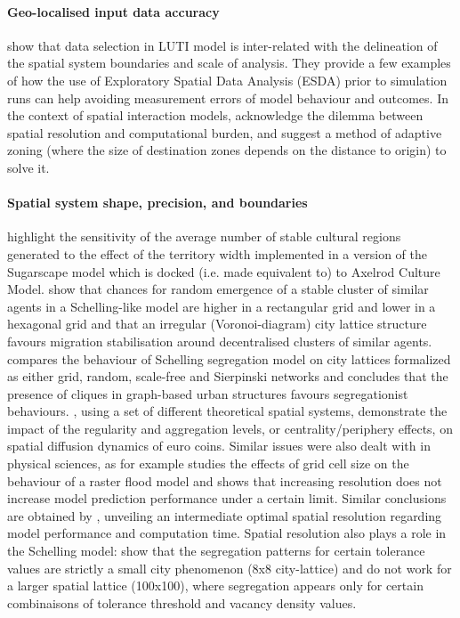 \documentclass[3p,times,procedia]{elsarticle}
\begin{document}
\paragraph{Geo-localised input data accuracy} \citet{Thomasetal2017} show that data selection in LUTI model is inter-related with the delineation of the spatial system boundaries and scale of analysis. They provide a few examples of how the use of Exploratory Spatial Data Analysis (ESDA) prior to simulation runs can help avoiding measurement errors of model behaviour and outcomes. In the context of spatial interaction models, \citet{hagen2012new} acknowledge the dilemma between spatial resolution and  computational burden, and suggest a method of adaptive zoning (where the size of destination zones depends on the distance to origin) to solve it.

\paragraph{Spatial system shape, precision, and boundaries} \citet{Axtelletal1996} highlight the sensitivity of the average number of stable cultural regions generated to the effect of the territory width implemented in a version of the Sugarscape model which is docked (i.e. made equivalent to) to Axelrod Culture Model. \citet{FlacheHegselmann2001} show that chances for random emergence of a stable cluster of similar agents in a Schelling-like model are higher in a rectangular grid and lower in a hexagonal grid and that an irregular (Voronoi-diagram) city lattice structure favours migration stabilisation around decentralised clusters of similar agents. \citet{Banos2012} compares the behaviour of Schelling segregation model on city lattices formalized as either grid, random, scale-free and Sierpinski networks and concludes that the presence of cliques in graph-based urban structures favours segregationist behaviours. \citet{LeTexierCaruso2017}, using a set of different theoretical spatial systems, demonstrate the impact of the regularity and aggregation levels, or centrality/periphery effects, on spatial diffusion dynamics of euro coins. Similar issues were also dealt with in physical sciences, as for example \cite{horritt2001effects} studies the effects of grid cell size on the behaviour of a raster flood model and shows that increasing resolution does not increase model prediction performance under a certain limit. Similar conclusions are obtained by \cite{vazquez2002effect}, unveiling an intermediate optimal spatial resolution regarding model performance and computation time. Spatial resolution also plays a role in the Schelling model: \citet{Singhetal2009} show that the segregation patterns for certain tolerance values are strictly a small city phenomenon (8x8 city-lattice) and do not work for a larger spatial lattice (100x100), where segregation appears only for certain combinaisons of tolerance threshold and vacancy density values.
\end{document}
